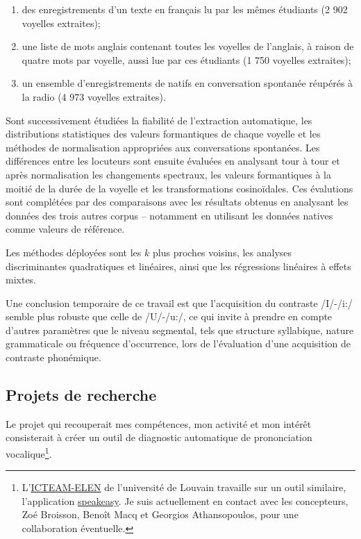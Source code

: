 \documentclass[
  10pt,
]{article}
\begin{document}
\begin{enumerate}
\def\labelenumi{\arabic{enumi}.}
\item
  des enregistrements d'un texte en français lu par les mêmes étudiants (2 902 voyelles extraites);
\item
  une liste de mots anglais contenant toutes les voyelles de l'anglais, à raison de quatre mots
  par voyelle, aussi lue par ces étudiants (1 750 voyelles extraites);
\item
  un ensemble d'enregistrements de natifs en conversation spontanée réupérés à la radio
  (4 973 voyelles extraites).
\end{enumerate}

Sont successivement étudiées la fiabilité de l'extraction automatique, les distributions statistiques
des valeurs formantiques de chaque voyelle et les méthodes de normalisation appropriées aux
conversations spontanées. Les différences entre les locuteurs sont ensuite évaluées en analysant
tour à tour et après normalisation les changements spectraux, les valeurs formantiques à la moitié
de la durée de la voyelle et les transformations cosinoïdales. Ces évalutions sont complétées par
des comparaisons avec les résultats obtenus en analysant les données des trois autres corpus --
notamment en utilisant les données natives comme valeurs de référence.

Les méthodes déployées sont les \(k\) plus proches voisins, les analyses discriminantes quadratiques
et linéaires, ainsi que les régressions linéaires à effets mixtes.

Une conclusion temporaire de ce travail est que l'acquisition du contraste /I/-/i:/ semble plus
robuste que celle de /U/-/u:/, ce qui invite à prendre en compte d'autres paramètres que le niveau
segmental, tels que structure syllabique, nature grammaticale ou fréquence d'occurrence, lors de l'évaluation d'une acquisition de contraste phonémique.

\pagebreak

\hypertarget{projets-de-recherche}{%
\subsection{Projets de recherche}\label{projets-de-recherche}}

Le projet qui recouperait mes compétences, mon activité et mon intérêt consisterait
à créer un outil de diagnostic automatique de prononciation
vocalique\footnote{L'\href{https://sites.uclouvain.be/elen/}{ICTEAM-ELEN} de l'université de
  Louvain travaille sur un outil similaire, l'application
  \href{https://www.speasy.app/}{speakeasy}. Je suis actuellement en contact avec les
  concepteurs, Zoé Broisson, Benoît Macq et Georgios Athansopoulos, pour une
  collaboration éventuelle.}.
\end{document}
